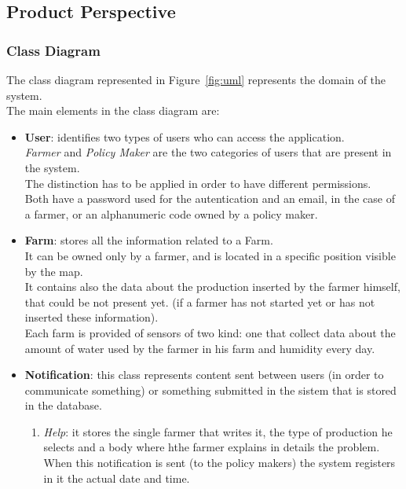 \subsection{Product Perspective}
\subsubsection{Class Diagram}
The class diagram represented in Figure~\ref{fig:uml} represents the domain of the system. \\
The main elements in the class diagram are:
\begin{itemize}
    \item \textbf{User}: identifies two types of users who can access the application.\\
    \textsl{Farmer} and \textsl{Policy Maker} are the two categories of users that are present in the system. \\
    The distinction has to be applied in order to have different permissions.\\
    Both have a password used for the autentication and an email, in the case of a farmer, or an alphanumeric code owned by a policy maker.
    \item \textbf{Farm}: stores all the information related to a Farm.\\ 
    It can be owned only by a farmer, and is located in a specific position visible by the map. \\
    It contains also the data about the production inserted by the farmer himself, that could be not present yet.
    (if a farmer has not started yet or has not inserted these information).\\
    Each farm is provided of sensors of two kind: one that collect data about the amount of water used by the farmer in his farm and humidity every day.\\
    \item \textbf{Notification}: this class represents content sent between users (in order to communicate something) or something submitted in the sistem that is stored in the database.
        \begin{enumerate}
            \item \textsl{Help}: it stores the single farmer that writes it, 
            the type of production he selects and a body where hthe farmer explains in details the problem.\\
            When this notification is sent (to the policy makers) the system registers in it the actual date and time.

\end{enumerate}
\end{itemize}
